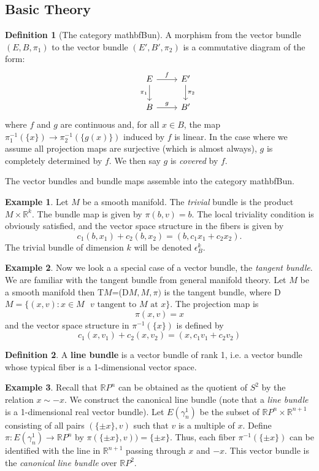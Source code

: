 \documentclass{article}
\theoremstyle{definition}
\newtheorem{ex}{Example}[section]
\newtheorem{defn}{Definition}[section]
\newcommand{\R}{\mathbb{R}}
\newcommand{\cat}{mathbf}
\begin{document}
\subsection{Basic Theory}
\begin{defn}[The category \cat{Bun}]
A morphism from the vector bundle $(E,B,\pi_{1})$ to the vector bundle $(E',B',\pi_{2})$ is a commutative diagram of the form:
\[
\begin{tikzcd}
&E\arrow[r,"f"]\arrow[d,"\pi_{1}"'] &E'\arrow[d,"\pi_{2}"]\\
&B\arrow[r,"g"] &B'
\end{tikzcd}
\]
where $f$ and $g$ are continuous and, for all $x\in B$, the map \\$\pi_{1}^{-1}(\{x\})\rightarrow\pi_{2}^{-1}(\{g(x)\})$ induced by $f$ is linear. In the case where we assume all projection maps are surjective (which is almost always), $g$ is completely determined by $f$. We then say $g$ is \textit{covered} by $f$. 

The vector bundles and bundle maps assemble into the category \cat{Bun}.
\end{defn}
\begin{ex}
Let $M$ be a smooth manifold. The \textit{trivial} bundle is the product $M\times\R^{k}$. The bundle map is given by $\pi(b,v)=b.$ The local triviality condition is obviously satisfied, and the vector space structure in the fibers is given by 
\[c_{1}(b,x_{1})+c_{2}(b,x_{2})=(b,c_{1}x_{1}+c_{2}x_{2}).\] The trivial bundle of dimension $k$ will be denoted $\epsilon_{B}^{k}.$
\end{ex}
\begin{ex}
Now we look a a special case of a vector bundle, the \textit{tangent bundle}. We are familiar with the tangent bundle from general manifold theory. Let $M$ be a smooth manifold then T$M$=(D$M,M, \pi)$ is the tangent bundle, where D$M=\{(x,v): x\in M \,\,\,\, v\,\,\text{tangent to}\,\, M \,\,\text{at}\,\,x \}$. The projection map is $$\pi(x,v)=x$$ and the vector space structure in $\pi^{-1}(\{x\})$ is defined by $$c_1(x,v_1)+c_2(x,v_2)=(x,c_1v_1+c_2v_2)$$
\end{ex}
\begin{defn}
A \textbf{line bundle} is a vector bundle of rank 1, i.e. a vector bundle whose typical fiber is a 1-dimensional vector space. 
\end{defn}
\begin{ex}
Recall that $\R P^{n}$ can be obtained as the quotient of $S^{2}$ by the relation $x\sim -x$. We construct the canonical line bundle (note that a \textit{line bundle} is a 1-dimensional real vector bundle). Let $E(\gamma^{1}_{n})$ be the subset of $\R P^{n}\times\R^{n+1}$ consisting of all pairs $(\{\pm x \},v)$ such that $v$ is a multiple of $x$. Define $\pi:E(\gamma^{1}_{n})\rightarrow \R P^{n}$ by $\pi(\{\pm x \},v))=\{\pm x\}$. Thus, each fiber $\pi^{-1}(\{\pm x\})$ can be identified with the line in $\R^{n+1}$ passing through $x$ and $-x$. This vector bundle is the \textit{canonical line bundle} over $\R P^{2}.$
\end{ex}
\end{document}
